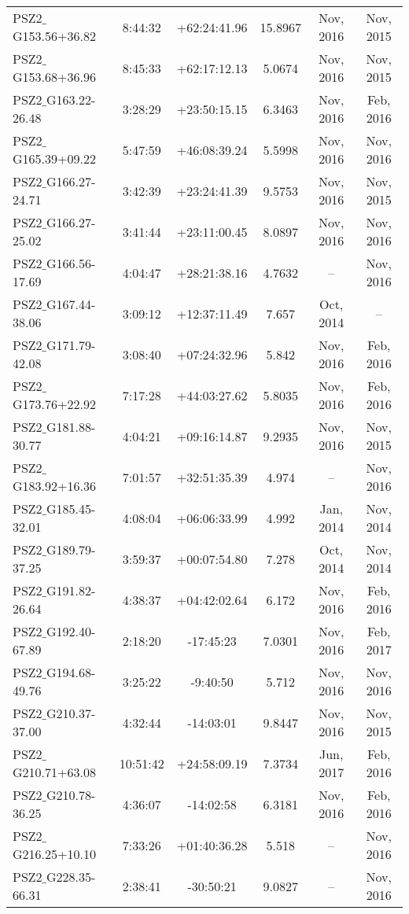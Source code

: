 \documentclass[apj, revtex4]{emulateapj}
\begin{document}
\begin{longtable*}{lccccc}
	PSZ2$\_$G153.56+36.82 & 8:44:32 & +62:24:41.96 & 15.8967 & Nov, 2016 & Nov, 2015 \\
	PSZ2$\_$G153.68+36.96 & 8:45:33 & +62:17:12.13 & 5.0674 & Nov, 2016 & Nov, 2015 \\
	PSZ2$\_$G163.22-26.48 & 3:28:29 & +23:50:15.15 & 6.3463 & Nov, 2016 & Feb, 2016 \\
	PSZ2$\_$G165.39+09.22 & 5:47:59 & +46:08:39.24 & 5.5998 & Nov, 2016 & Nov, 2016 \\
	PSZ2$\_$G166.27-24.71 & 3:42:39 & +23:24:41.39 & 9.5753 & Nov, 2016 & Nov, 2015 \\
	PSZ2$\_$G166.27-25.02 & 3:41:44 & +23:11:00.45 & 8.0897 & Nov, 2016 & Nov, 2016 \\
	PSZ2$\_$G166.56-17.69 & 4:04:47 & +28:21:38.16 & 4.7632 & -- & Nov, 2016 \\
	PSZ2$\_$G167.44-38.06 & 3:09:12 & +12:37:11.49 & 7.657 & Oct, 2014 & -- \\
	PSZ2$\_$G171.79-42.08 & 3:08:40 & +07:24:32.96 & 5.842 & Nov, 2016 & Feb, 2016 \\
	PSZ2$\_$G173.76+22.92 & 7:17:28 & +44:03:27.62 & 5.8035 & Nov, 2016 & Feb, 2016 \\
	PSZ2$\_$G181.88-30.77 & 4:04:21 & +09:16:14.87 & 9.2935 & Nov, 2016 & Nov, 2015 \\
	PSZ2$\_$G183.92+16.36 & 7:01:57 & +32:51:35.39 & 4.974 & -- & Nov, 2016 \\
	PSZ2$\_$G185.45-32.01 & 4:08:04 & +06:06:33.99 & 4.992 & Jan, 2014 & Nov, 2014 \\
	PSZ2$\_$G189.79-37.25 & 3:59:37 & +00:07:54.80 & 7.278 & Oct, 2014 & Nov, 2014 \\
	PSZ2$\_$G191.82-26.64 & 4:38:37 & +04:42:02.64 & 6.172 & Nov, 2016 & Feb, 2016 \\
	PSZ2$\_$G192.40-67.89 & 2:18:20 & -17:45:23 & 7.0301 & Nov, 2016 & Feb, 2017 \\
	PSZ2$\_$G194.68-49.76 & 3:25:22 & -9:40:50 & 5.712 & Nov, 2016 & Nov, 2016 \\
	PSZ2$\_$G210.37-37.00 & 4:32:44 & -14:03:01 & 9.8447 & Nov, 2016 & Nov, 2015 \\
	PSZ2$\_$G210.71+63.08 & 10:51:42 & +24:58:09.19 & 7.3734 & Jun, 2017 & Feb, 2016 \\
	PSZ2$\_$G210.78-36.25 & 4:36:07 & -14:02:58 & 6.3181 & Nov, 2016 & Feb, 2016 \\
	PSZ2$\_$G216.25+10.10 & 7:33:26 & +01:40:36.28 & 5.518 & -- & Nov, 2016 \\
	PSZ2$\_$G228.35-66.31 & 2:38:41 & -30:50:21 & 9.0827 & -- & Nov, 2016 \\

\end{longtable*}
\end{document}
